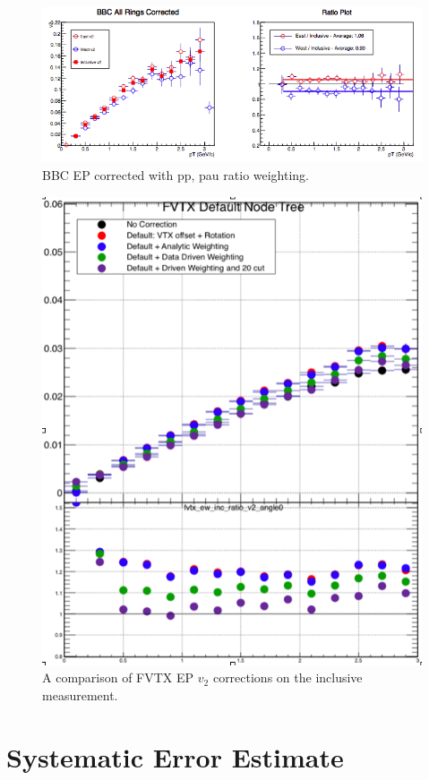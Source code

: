 \begin{figure}[!h]
\begin{center}
\includegraphics[width=0.5\linewidth]{figs/bbc_pp_correction.png}
\caption{BBC EP corrected with pp, pau ratio weighting.}
\end{center}
\end{figure}
\begin{figure}[!h]
\begin{center}
\includegraphics[width=0.5\linewidth]{figs/fvtx_incl_v2_comparison_corrections.png}
\caption{A comparison of FVTX EP $v_2$ corrections on the inclusive measurement.}
\end{center}
\end{figure}
\section{Systematic Error Estimate}
